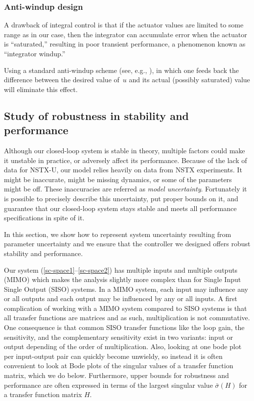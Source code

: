 \documentclass[12pt,lot, lof]{puthesis}
\begin{document}
\subsubsection{Anti-windup design}
A drawback of integral control is that if the actuator values are limited to some range as in our case, then the integrator can accumulate error when the actuator is ``saturated,'' resulting in poor transient performance, a phenomenon known as ``integrator windup.'' 

Using a standard anti-windup scheme (see, e.g., \cite{AandM, Lewis}), in which one feeds back the difference between the desired value of~$u$ and its actual (possibly saturated) value will eliminate this effect.  

\subsection{Study of robustness in stability and performance}

Although our closed-loop system is stable in theory, multiple factors could make it unstable in practice, or adversely affect its performance.
Because of the lack of data for NSTX-U, our model relies heavily on data from NSTX experiments.
It might be inaccurate, might be missing dynamics, or some of the parameters might be off.
These inaccuracies are referred as \emph{model uncertainty}.
Fortunately it is possible to precisely describe this uncertainty, put proper bounds on it, and guarantee that our closed-loop system stays stable and meets all performance specifications in spite of it.

In this section, we show how to represent system uncertainty resulting from parameter uncertainty and we ensure that the controller we designed offers robust stability and performance.

Our system (\ref{sc-space1}--\ref{sc-space2}) has multiple inputs and multiple outputs (MIMO) which makes the analysis slightly more complex than for Single Input Single Output (SISO) systems. In a MIMO system, each input may influence any or all outputs and each output may be influenced by any or all inputs.
A first complication of working with a MIMO system compared to SISO systems is that all transfer functions are matrices and as such, multiplication is not commutative.
One consequence is that common SISO transfer functions like the loop gain, the sensitivity, and the complementary sensitivity exist in two variants: input or output depending of the order of multiplication.
Also, looking at one bode plot per input-output pair can quickly become unwieldy, so instead it is often convenient to look at Bode plots of the singular values of a transfer function matrix, which we do below.
Furthermore, upper bounds for robustness and performance are often expressed in terms of the largest singular value $\bar\sigma(H)$ for a transfer function matrix $H$.
\end{document}
